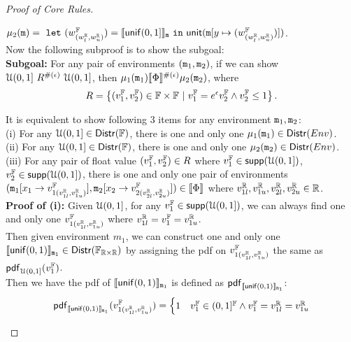 \documentclass[a4paper,11pt]{article}
\begin{document}
\begin{proof}[Proof of Core Rules]
\begin{itemize}
	$\mu_2(\mathtt{m}) = 
	~\mathtt{let}~ (w^{\mathbb{F}}_{(w^{\mathbb{R}}_{l}, w^{\mathbb{R}}_{u})})
	= \llbracket \mathsf{unif}(0, 1] \rrbracket_{\mathtt{m}} 
	~\mathtt{in}~ 
	\mathsf{unit}(\mathtt{m}[y \mapsto (w^{\mathbb{F}}_{(w^{\mathbb{R}}_{l}, w^{\mathbb{R}}_{u})})])$.
	\\
	Now the following subproof is to show the subgoal:
	\\
	\textbf{Subgoal:} For any pair of environments $(\mathtt{m}_1, \mathtt{m}_2)$, if we can show ${\mathcal{U}(0,1]} ~ R^{\#(\epsilon)} ~ {\mathcal{U}(0,1]}$, then $\mu_1(\mathtt{m}_1) \llbracket \Phi \rrbracket^{\#(\epsilon)} \mu_2(\mathtt{m}_2)$,
	where
	\[
		R = 
		\left \{(v^{\mathbb{F}}_1, v^{\mathbb{F}}_2) \in \mathbb{F} \times \mathbb{F} 
		~\vert~
		v^{\mathbb{F}}_1  = e^{\epsilon}  v^{\mathbb{F}}_2 
		\land v^{\mathbb{F}}_2 \leq 1
		\right \}.
	\]	%
	\begin{subproof}
	It is equivalent to show following 3 items for any environment $\mathtt{m}_1, \mathtt{m}_2$:
	\\
	(i) For any $\mathcal{U}(0,1]\in \mathsf{Distr}(\mathbb{F})$, there is one and only one $\mu_1(\mathtt{m}_1) \in \mathsf{Distr}(Env)$.
	\\
	(ii) For any $\mathcal{U}(0,1] \in \mathsf{Distr}(\mathbb{F})$, there is one and only one $\mu_2(\mathtt{m}_2) \in \mathsf{Distr}(Env)$.
	\\
	(iii) For any pair of float value $(v^{\mathbb{F}}_1, v^{\mathbb{F}}_2) \in R$ where 
	$v^{\mathbb{F}}_1 \in \mathsf{supp}(\mathcal{U}(0,1])$, 
	$v^{\mathbb{F}}_2 \in \mathsf{supp}(\mathcal{U}(0,1])$,
	there is one and only one pair of environments 
	$(\mathtt{m}_1[ x_1 \to v^{\mathbb{F}}_{1(v^{\mathbb{R}}_{1l}, v^{\mathbb{R}}_{1u})}], \mathtt{m}_2[x_2 \to v^{\mathbb{F}}_{2(v^{\mathbb{R}}_{2l}, v^{\mathbb{R}}_{2u})}]) \in \llbracket \Phi \rrbracket$
	where $v^{\mathbb{R}}_{1l}, v^{\mathbb{R}}_{1u}, v^{\mathbb{R}}_{2l}, v^{\mathbb{R}}_{2u} \in \mathbb{R}$.
	\\ 
	\textbf{Proof of (i):} 
	Given $\mathcal{U}(0,1]$, for any $v^{\mathbb{F}}_1 \in \mathsf{supp}(\mathcal{U}(0,1])$, 
	we can always find one and only one $v^{\mathbb{F}}_{1(v^{\mathbb{R}}_{1l}, v^{\mathbb{R}}_{1u})}$ where $v^{\mathbb{R}}_{1l} = v^{\mathbb{F}}_1 = v^{\mathbb{R}}_{1u}$.
	\\
	Then given environment $m_1$,
	we can construct one and only one $\llbracket \mathsf{unif}(0, 1) \rrbracket_{\mathtt{m}_1} \in \mathsf{Distr}(\mathbb{F}_{\mathbb{R} \times \mathbb{R}})$
	by assigning the pdf on $v^{\mathbb{F}}_{1(v^{\mathbb{R}}_{1l}, v^{\mathbb{R}}_{1u})}$ the same as $\mathsf{pdf}_{\mathcal{U}(0,1]}(v^{\mathbb{F}}_1)$. 
	\\
	Then we have the pdf of $\llbracket \mathsf{unif}(0, 1) \rrbracket_{\mathtt{m}_1}$  
	is defined as $\mathsf{pdf}_{\llbracket \mathsf{unif}(0, 1) \rrbracket_{\mathtt{m}_1}}$:
	\[
	\mathsf{pdf}_{\llbracket \mathsf{unif}(0, 1) \rrbracket_{\mathtt{m}_1}}(v^{\mathbb{F}}_{1(v^{\mathbb{R}}_{1l}, v^{\mathbb{R}}_{1u})}) = 
		\begin{cases}
		1 & v^{\mathbb{F}}_1 \in (0,1]^{\mathbb{F}}
		\land  v^{\mathbb{F}}_1 = v^{\mathbb{R}}_{1l} = v^{\mathbb{R}}_{1u}
		\\

\end{cases}\]
\end{subproof}
\end{itemize}
\end{proof}
\end{document}
